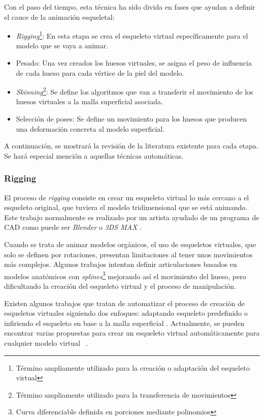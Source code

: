 Con el paso del tiempo, esta técnica ha sido divida en fases que ayudan a definir el cauce de la animación esqueletal:

\begin{itemize}
    \item \emph{Rigging}\footnote{Término ampliamente utilizado para la creación o adaptación del esqueleto virtual}: En esta etapa se crea el esqueleto virtual específicamente para el modelo que se vaya a animar.
    \item Pesado: Una vez creados los huesos virtuales, se asigna el peso de influencia de cada hueso para cada vértice de la piel del modelo.
    \item \emph{Skinning}\footnote{Término ampliamente utilizado  para la transferencia de movimientos}: Se define los algoritmos que van a transferir el movimiento de los huesos virtuales a la malla superficial asociada. 
    \item Selección de poses: Se define un movimiento para los huesos que producen una deformación concreta al modelo superficial.
\end{itemize}

A continuación, se mostrará la revisión de la literatura existente para cada etapa. Se hará especial mención a aquellas técnicas automáticas.


\subsubsection{Rigging}
\label{art:rigging}

El proceso de \emph{rigging} consiste en crear un esqueleto virtual lo más cercano a el esqueleto original, que tuviera el modelo tridimensional que se está animando. Este trabajo normalmente es realizado por un artista ayudado de un programa de \ac{CAD} como puede ser \emph{Blender} \cite{blender} o \emph{3DS MAX} \cite{3ds}. 

Cuando se trata de animar modelos orgánicos, el uso de esqueletos virtuales, que solo se definen por rotaciones, presentan limitaciones al tener unos movimientos más complejos. Algunos trabajos intentan definir articulaciones basados en modelos anatómicos \cite{joints} con \emph{splines}\footnote{ Curva diferenciable definida en porciones mediante polinomios} mejorando así el movimiento del hueso, pero dificultando la creación del esqueleto virtual y el proceso de manipulación.

Existen algunos trabajos que tratan de automatizar el proceso de creación de esqueletos virtuales siguiendo dos enfoques: adaptando esqueleto predefinido \cite{huang2013robust} o infiriendo el esqueleto en base a la malla superficial \cite{jacobson2014part}.
Actualmente, se pueden encontrar varias propuestas para crear un esqueleto virtual automáticamente para cualquier modelo virtual ~\cite{borosan2012rigmesh,feng2014fast,avril2016animation}.





